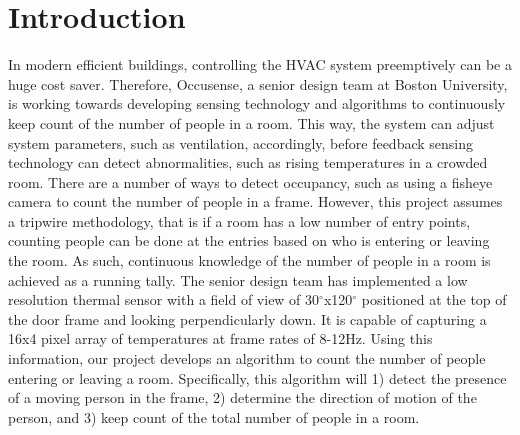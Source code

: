 \documentclass[12pt,oneside]{article} %
\begin{document}
\tableofcontents\bueceemptypage
\listoffigures\bueceemptypage
\listoftables\bueceemptypage

\buecereportheaders

\setcounter{page}{1}

\section{Introduction}  %
In modern efficient buildings, controlling the HVAC system preemptively can be a huge cost saver. Therefore, Occusense, a senior design team at Boston University, is working towards developing sensing technology and algorithms to continuously keep count of the number of people in a room. This way, the system can adjust system parameters, such as ventilation, accordingly, before feedback sensing technology can detect abnormalities, such as rising temperatures in a crowded room. There are a number of ways to detect occupancy, such as using a fisheye camera to count the number of people in a frame. However, this project assumes a tripwire methodology, that is if a room has a low number of entry points, counting people can be done at the entries based on who is entering or leaving the room. As such, continuous knowledge of the number of people in a room is achieved as a running tally. The senior design team has implemented a low resolution thermal sensor with a field of view of 30$^\circ$x120$^\circ$ positioned at the top of the door frame and looking perpendicularly down. It is capable of capturing a 16x4 pixel array of temperatures at frame rates of 8-12Hz. Using this information, our project develops an algorithm to count the number of people entering or leaving a room. Specifically, this algorithm will 1) detect the presence of a moving person in the frame, 2) determine the direction of motion of the person, and 3) keep count of the total number of people in a room.
\end{document}
